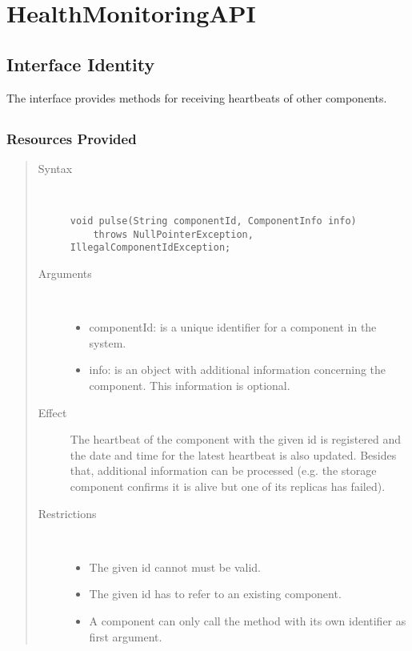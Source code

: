 \section{HealthMonitoringAPI}
\label{api:health-monitoring-unit-api}

\subsection{Interface Identity}

\npar The  interface provides methods for
receiving heartbeats of other components.

\subsection{}

\subsubsection{Resources Provided}

\begin{quote}
	\begin{description}
		\item[Syntax] \
		\begin{verbatim}
void pulse(String componentId, ComponentInfo info)
    throws NullPointerException, IllegalComponentIdException;
		\end{verbatim}
		\item[Arguments] \
		\begin{itemize}
		  \item componentId: is a unique identifier for a component in the system.
		  \item info: is an object with additional information concerning the
		  component. This information is optional.
		\end{itemize}
		\item[Effect] The heartbeat of the component with the given id is registered
		and the date and time for the latest heartbeat is also updated. Besides that,
		additional information can be processed (e.g. the storage component confirms
		it is alive but one of its replicas has failed).
		\item[Restrictions] \
		\begin{itemize}
		  \item The given id cannot must be valid.
		  \item The given id has to refer to an existing component.
		  \item A component can only call the  method with its own
		  identifier as first argument. 
		\end{itemize}
	\end{description} 
\end{quote}

